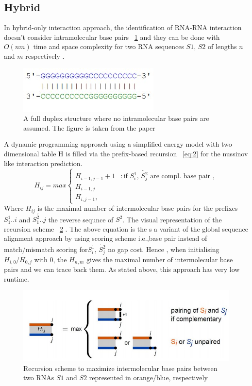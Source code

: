 \documentclass[twoside,a4paper]{report}
\begin{document}
	
	\subsection{Hybrid}
	In hybrid-only interaction approach, the identification of RNA-RNA interaction doesn't consider intramolecular base pairs ~\ref{fig:rnahybrid} and they can be done with $O(nm)$ time and space complexity for two RNA sequences $S1$, $S2$ of lengths $n$ and $m$ respectively \citep{tjaden2006target}.\\
	
	\begin{figure}[H]
		\includegraphics[width=0.4\linewidth]{rnahybrid}
		\centering
		\caption{ A full duplex structure where no intramolecular base pairs are assumed. The figure is taken from the paper \citep{wright2018structure}} 
		\label{fig:rnahybrid}
	\end{figure}
	
	
	 A dynamic programming approach using a simplified energy model with two dimensional table H is filled via the prefix-based recursion ~\ref{eq:2} for the nussinov like interaction prediction.\\
	 \begin{equation}
	 \label{eq:2}
	H_{ij} = max \begin{cases}
	H_{i-1,j-1}+1 & : \text{if $S^1_i$, $\overleftarrow{S^2_j}$ are compl. base pair }, \\
	H_{i-1,j} \\
	H_{i,j-1} ,
	\end{cases}
	\end{equation}
	Where $H_{ij}$ is the maximal number of intermolecular base pairs for the prefixes $S^1_1..i$	and $\overleftarrow{S^2_1..j}$ the reverse sequnce of $S^2$. The visual representation of the recursion scheme ~\ref{fig:hybrid} . The above equation is the s a variant of the global sequence alignment approach by \citep{needleman1970general} using scoring scheme i.e.,base pair instead of match/mismatch scoring for$S^1_i$, $\overleftarrow{S^2_j}$ no gap cost. Hence , when initialising $ H_{i,0} / H_{0,j} $ with 0, the $H_{n,m} $ gives the maximal number of intermolecular base pairs and we can trace back them. As stated above, this approach has very low runtime.\\
	 \begin{figure}[h]
		\includegraphics[width=0.8\linewidth]{hybrid}
		\centering
		\caption{Recursion scheme to maximize intermolecular base pairs between two RNAs $S1$ and $S2$ represented in orange/blue, respectively} 
		\label{fig:hybrid}
	\end{figure}
	
\end{document}
